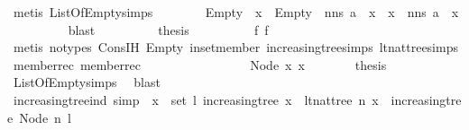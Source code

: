 \begin{isabellebody}
\ {\isacharparenleft}metis\ ListOfEmpty{\isachardot}simps{\isacharparenright}\isanewline
\ \ \ \ \ \ \isamarkupfalse%
\ {\isachardoublequoteopen}{\isacharparenleft}Empty\ {\isacharhash}\ x\ {\isacharequal}\ Empty\ {\isacharhash}\ nns\ {\isacharparenleft}a\ {\isacharhash}\ x{\isacharparenright}{\isacharparenright}\ {\isacharequal}\ {\isacharparenleft}x\ {\isacharequal}\ nns\ {\isacharparenleft}a\ {\isacharhash}\ x{\isacharparenright}{\isacharparenright}{\isachardoublequoteclose}\isanewline
\ \ \ \ \ \ \ \ \isamarkupfalse%
\ blast\isanewline
\ \ \ \ \ \ \isamarkupfalse%
\ \isamarkupfalse%
\ {\isacharquery}thesis\isanewline
\ \ \ \ \ \ \ \ \isamarkupfalse%
\ f{}\ f{}\ \isamarkupfalse%
\ {\isacharparenleft}metis\ {\isacharparenleft}no{\isacharunderscore}types{\isacharparenright}\ Cons{\isachardot}IH\ Empty\ in{\isacharunderscore}set{\isacharunderscore}member\ increasing{\isacharunderscore}tree{\isachardot}simps{\isacharparenleft}{}{\isacharparenright}\ lt{\isacharunderscore}nat{\isacharunderscore}tree{\isachardot}simps{\isacharparenleft}{}{\isacharparenright}\ member{\isacharunderscore}rec{\isacharparenleft}{}{\isacharparenright}\ member{\isacharunderscore}rec{\isacharparenleft}{}{\isacharparenright}{\isacharparenright}\isanewline
\ \ \ \ \isamarkupfalse%
\ \isanewline
\ \ \ \ \isamarkupfalse%
\isanewline
\ \ \ \ \isamarkupfalse%
\ {\isacharparenleft}Node\ x{}{}\ x{}{}{\isacharparenright}\isanewline
\ \ \ \ \isamarkupfalse%
\ \isamarkupfalse%
\ {\isacharquery}thesis\isanewline
\ \ \ \ \ \ \isamarkupfalse%
\ ListOfEmpty{\isachardot}simps\ \isamarkupfalse%
\ blast\ \isanewline
\ \ \isamarkupfalse%
\isanewline
\ \ \ \ \isanewline
{}\isamarkupfalse%
%
\endisatagproof
{\isafoldproof}%
%
\isadelimproof
\isanewline
%
\endisadelimproof
\ \ \isanewline
{}\isamarkupfalse%
\ increasing{\isacharunderscore}tree{\isacharunderscore}ind\ {\isacharbrackleft}simp{\isacharbrackright}\ {\isacharcolon}\ {\isachardoublequoteopen}{\isacharparenleft}{\isasymforall}x\ {\isasymin}\ set\ l{\isachardot}\ increasing{\isacharunderscore}tree\ x\ {\isasymand}\ lt{\isacharunderscore}nat{\isacharunderscore}tree\ n\ x{\isacharparenright}\ {\isasymlongleftrightarrow}\ increasing{\isacharunderscore}tree\ {\isacharparenleft}Node\ n\ l{\isacharparenright}{\isachardoublequoteclose}\isanewline

\end{isabellebody}
